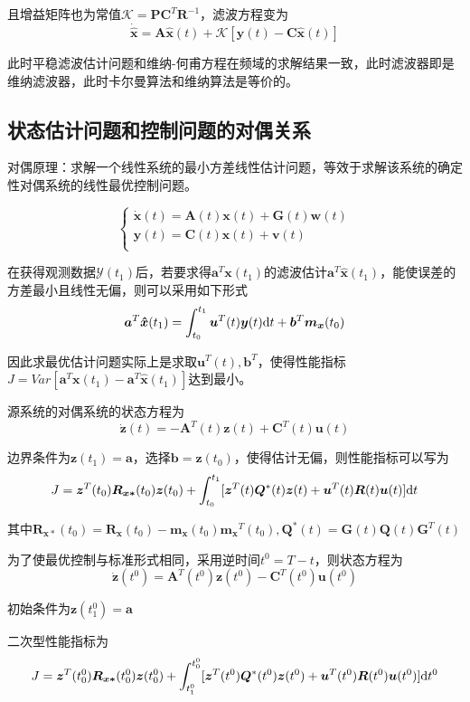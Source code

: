 \documentclass[11pt,a4paper]{ctexart}
\renewcommand{\d}{{\rm d}}
\begin{document}
            且增益矩阵也为常值$\mathscr{K}=\bm{PC}^T\bm R^{-1}$，滤波方程变为
            \[
            \bm{\dot{\hat x}}=\bm A\bm{\hat x}(t)+\mathscr{K}[\bm y(t)-\bm C\bm{\hat x}(t)]
            \]

            此时平稳滤波估计问题和维纳-何甫方程在频域的求解结果一致，此时滤波器即是维纳滤波器，此时卡尔曼算法和维纳算法是等价的。
    \subsection{状态估计问题和控制问题的对偶关系}
        对偶原理：求解一个线性系统的最小方差线性估计问题，等效于求解该系统的确定性对偶系统的线性最优控制问题。

        \[\begin{cases}
        \bm{\dot x}(t)=\bm{A}(t)\bm{x}(t)+\bm{G}(t)\bm{w}(t)\\
        \bm{y}(t)=\bm{C}(t)\bm{x}(t)+\bm{v}(t)\\
        \end{cases}\]

        在获得观测数据$\mathscr{Y}(t_1)$后，若要求得$\bm  a^T\bm x(t_1)$的滤波估计$\bm a^T\bm{\hat x}(t_1)$，能使误差的方差最小且线性无偏，则可以采用如下形式
        \[
        \bm a^T\bm{\hat x}(t_1)=\int_{t_0}^{t_1}\bm u^T(t)\bm y(t)\d t+\bm b^T\bm{m_x}(t_0)
        \]

        因此求最优估计问题实际上是求取$\bm u^T(t),\bm b^T$，使得性能指标$J=Var[\bm a^T\bm x(t_1)-\bm a^T\bm{\hat x}(t_1)]$达到最小。

        源系统的对偶系统的状态方程为
        \[
        \bm{\dot z}(t)=-\bm A^T(t)\bm z(t)+\bm C^T(t)\bm u(t)
        \]

        边界条件为$\bm z(t_1)=\bm a$，选择$\bm b=\bm z(t_0)$，使得估计无偏，则性能指标可以写为
        \[
        J=\bm z^T(t_0)\bm{R_{x*}}(t_0)\bm z(t_0)+\int_{t_0}^{t_1}[\bm z^T(t)\bm Q^*(t)\bm z(t)+\bm u^T(t)\bm R(t)\bm u(t)]\d t
        \]

        其中$\bm{R_{x*}}(t_0)=\bm{R_x}(t_0)-\bm{m_x}(t_0)\bm{m_x}^T(t_0),\bm Q^*(t)=\bm G(t)\bm Q(t)\bm G^T(t)$

        为了使最优控制与标准形式相同，采用逆时间$t^0=T-t$，则状态方程为
        \[
        \bm{\dot z}(t^0)=\bm A^T(t^0)\bm z(t^0)-\bm C^T(t^0)\bm u(t^0)
        \]

        初始条件为$\bm z(t_1^0)=\bm a$

        二次型性能指标为
        \[
        J=\bm z^T(t_0^0)\bm{R_{x*}}(t_0^0)\bm z(t_0^0)+\int_{t_1^0}^{t_0^0}[\bm z^T(t^0)\bm Q^*(t^0)\bm z(t^0)+\bm u^T(t^0)\bm R(t^0)\bm u(t^0)]\d t^0
        \]
\end{document}
